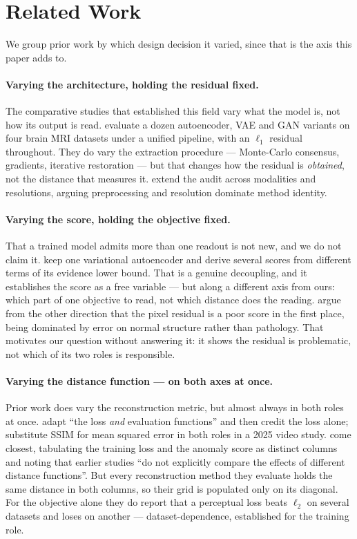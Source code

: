 \documentclass[pmlr,twocolumn,10pt]{jmlr} %
\begin{document}
\section{Related Work}
\label{sec:related}
We group prior work by which design decision it varied, since that is the axis this paper
adds to.

\paragraph*{Varying the architecture, holding the residual fixed.}
The comparative studies that established this field vary what the model is, not how its
output is read. \citet{baur2021autoencoders} evaluate a dozen autoencoder, VAE and GAN
variants on four brain MRI datasets under a unified pipeline, with an $\ell_1$ residual
throughout. They do vary the extraction procedure --- Monte-Carlo consensus, gradients,
iterative restoration --- but that changes how the residual is \emph{obtained}, not the
distance that measures it. \citet{lagogiannis2024unsupervised} extend the audit across
modalities and resolutions, arguing preprocessing and resolution dominate method identity.

\paragraph*{Varying the score, holding the objective fixed.}
That a trained model admits more than one readout is not new, and we do not claim it.
\citet{zimmerer2019unsupervised} keep one variational autoencoder and derive several scores
from different terms of its evidence lower bound. That is a genuine decoupling, and it
establishes the score as a free variable --- but along a different axis from ours: which
part of one objective to read, not which distance does the reading. \citet{meissen2022pitfalls} argue from the other
direction that the pixel residual is a poor score in the first place, being dominated by
error on normal structure rather than pathology. That motivates our question without
answering it: it shows the residual is problematic, not which of its two roles is
responsible.

\paragraph*{Varying the distance function --- on both axes at once.}
Prior work does vary the reconstruction metric, but almost always in both roles at once.
\citet{bergmann2019improving} adapt ``the loss \emph{and} evaluation functions'' and then
credit the loss alone; \citet{fan2025ssim} substitute SSIM for mean squared error in both
roles in a 2025 video study. \citet{cai2025medianomaly} come closest, tabulating the
training loss and the anomaly score as distinct columns and noting that earlier studies
``do not explicitly compare the effects of different distance functions''. But every
reconstruction method they evaluate holds the same distance in both columns, so their grid
is populated only on its diagonal. For the objective alone they do report that a perceptual
loss beats $\ell_2$ on several datasets and loses on another --- dataset-dependence,
established for the training role.
\end{document}
